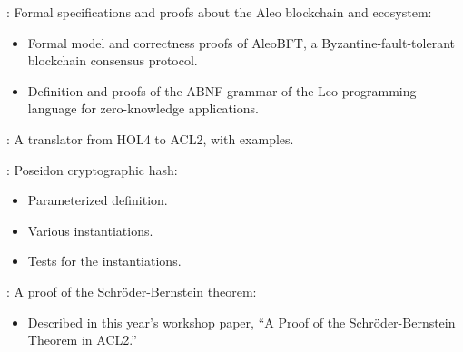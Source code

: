 
\begin{frame}

\newlibtitle

:
Formal specifications and proofs about the Aleo blockchain and ecosystem:
\begin{itemize}
\item Formal model and correctness proofs of AleoBFT,
      a Byzantine-fault-tolerant blockchain consensus protocol.
\item Definition and proofs of the ABNF grammar of
      the Leo programming language for zero-knowledge applications.
\end{itemize}

\end{frame}


\begin{frame}

\newlibtitle

:
A translator from HOL4 to ACL2, with examples.

\end{frame}


\begin{frame}

\newlibtitle

:
Poseidon cryptographic hash:
\begin{itemize}
\item Parameterized definition.
\item Various instantiations.
\item Tests for the instantiations.
\end{itemize}

\end{frame}


\begin{frame}

\newlibtitle

:
A proof of the Schr{\"o}der-Bernstein theorem:
\begin{itemize}
\item Described in this year's workshop paper,
      ``A Proof of the Schr{\"o}der-Bernstein Theorem in {ACL2}.''
\end{itemize}

\end{frame}

